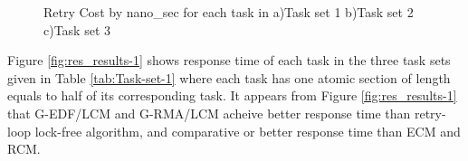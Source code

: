 \documentclass[conference]{sig-alternate}
\begin{document}
\begin{figure}[htbp]

\caption{\label{fig:RC_results}Retry Cost by nano\_sec for each task in a)Task
set 1 b)Task set 2 c)Task set 3}

\end{figure}

Figure \ref{fig:res_results-1} shows response time of each task in
the three task sets given in Table \ref{tab:Task-set-1} where each
task has one atomic section of length equals to half of its corresponding
task. It appears from Figure \ref{fig:res_results-1} that G-EDF/LCM
and G-RMA/LCM acheive better response time than retry-loop lock-free
algorithm, and comparative or better response time than ECM and RCM.
\end{document}
